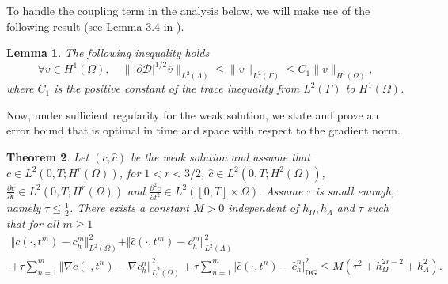 \documentclass[pdflatex,sn-mathphys-num]{sn-jnl}%
\newcommand{\DG}{\mathrm{DG}}
\theoremstyle{thmstyleone}%
\newtheorem{theorem}{Theorem}%
\newtheorem{lemma}[theorem]{Lemma}%
\theoremstyle{thmstyletwo}%
\theoremstyle{thmstylethree}%
\begin{document}
To handle the coupling term in the analysis below, we will make use of the following result (see Lemma 3.4 in \cite{Zunino19}).
\begin{lemma}\label{lem:trace}
The following inequality holds 
\[
\forall v \in H^1(\Omega), \quad \| \vert \partial \mathcal{D}\vert^{1/2} \overline{v}\|_{L^2(\Lambda)} \leq\|v\|_{L^2(\Gamma)} \leq C_1\|v\|_{H^1(\Omega)}, 
\]
where $C_1$ is the positive constant of the trace inequality from $L^2(\Gamma)$ to $H^1(\Omega)$.
\end{lemma}
Now, under sufficient regularity for the weak solution, we state and prove an error bound that is optimal in time and space with respect to the gradient norm. 
%
\begin{theorem}
Let $(c,\hat c)$ be the weak solution and assume that 
$c \in L^2(0,T;H^r(\Omega))$, for $1<r<3/2$,  
$\hat c \in L^2(0,T;H^2(\Omega))$, 
$\frac{\partial c}{\partial t} \in L^2(0,T;H^r(\Omega))$ and
$\frac{\partial^2 c}{\partial t^2} \in L^2([0,T]\times\Omega).$
Assume $\tau$ is small enough, namely $\tau \leq \frac12$. 
There exists a constant $M>0$ independent of $h_\Omega, h_\Lambda$ and $\tau$ such that for all $m\geq 1$
    \begin{align}
    \Vert   c(\cdot,t^m)-c_h^m \Vert_{L^2(\Omega)}^2
    +  \Vert \hat c(\cdot,t^m)-c_h^m\Vert_{L^2(\Lambda)}^2
\nonumber\\
+ \tau \sum_{n=1}^m \Vert \nabla c(\cdot,t^n) - \nabla c_h^n \Vert_{L^2(\Omega)}^2
+ \tau \sum_{n=1}^m \vert \hat c(\cdot,t^n) - \hat c_h^n \vert_{\DG}^2
     \leq  
     M (\tau^2 + h_\Omega^{2r-2}+ h_\Lambda^2).
     \end{align}
\end{theorem}
%
\end{document}
